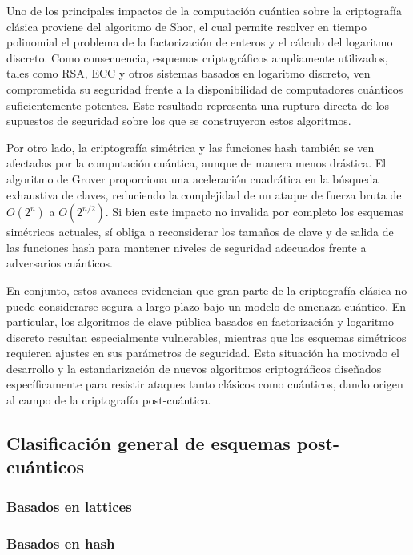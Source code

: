 Uno de los principales impactos de la computación cuántica sobre la criptografía clásica proviene del algoritmo de Shor, el cual permite resolver en tiempo polinomial el problema de la factorización de enteros y el cálculo del logaritmo discreto. Como consecuencia, esquemas criptográficos ampliamente utilizados, tales como RSA, ECC y otros sistemas basados en logaritmo discreto, ven comprometida su seguridad frente a la disponibilidad de computadores cuánticos suficientemente potentes. Este resultado representa una ruptura directa de los supuestos de seguridad sobre los que se construyeron estos algoritmos.

Por otro lado, la criptografía simétrica y las funciones hash también se ven afectadas por la computación cuántica, aunque de manera menos drástica. El algoritmo de Grover proporciona una aceleración cuadrática en la búsqueda exhaustiva de claves, reduciendo la complejidad de un ataque de fuerza bruta de $O(2^n)$ a $O(2^{n/2})$. Si bien este impacto no invalida por completo los esquemas simétricos actuales, sí obliga a reconsiderar los tamaños de clave y de salida de las funciones hash para mantener niveles de seguridad adecuados frente a adversarios cuánticos.

En conjunto, estos avances evidencian que gran parte de la criptografía clásica no puede considerarse segura a largo plazo bajo un modelo de amenaza cuántico. En particular, los algoritmos de clave pública basados en factorización y logaritmo discreto resultan especialmente vulnerables, mientras que los esquemas simétricos requieren ajustes en sus parámetros de seguridad. Esta situación ha motivado el desarrollo y la estandarización de nuevos algoritmos criptográficos diseñados específicamente para resistir ataques tanto clásicos como cuánticos, dando origen al campo de la criptografía post-cuántica.

\subsection{Clasificación general de esquemas post-cuánticos}

\subsubsection{Basados en lattices}

\subsubsection{Basados en hash}

